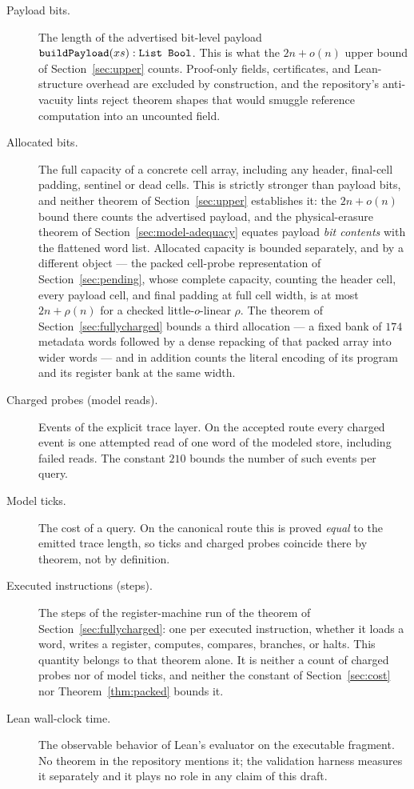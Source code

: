 \documentclass[11pt]{article}
\newcommand{\ledger}[1]{}
\newcommand{\leanid}[1]{\ifmmode\text{\ttfamily\upshape #1}\else{\def\UrlFont{\ttfamily\upshape}\nolinkurl{#1}}\fi}
\theoremstyle{definition}
\theoremstyle{remark}
\begin{document}
\begin{description}
\item[Payload bits.] The length of the advertised bit-level payload
  $\leanid{buildPayload}(xs) : \leanid{List Bool}$. This is what the
  $2n + o(n)$ upper bound of Section~\ref{sec:upper} counts. Proof-only
  fields, certificates, and Lean-structure overhead are excluded by
  construction, and the repository's anti-vacuity lints reject theorem
  shapes that would smuggle reference computation into an uncounted field.
\item[Allocated bits.] The full capacity of a concrete cell array,
  including any header, final-cell padding, sentinel or dead cells. This is
  strictly stronger than payload bits, and neither theorem of
  Section~\ref{sec:upper} establishes it: the $2n + o(n)$ bound there counts
  the advertised payload, and the physical-erasure theorem of
  Section~\ref{sec:model-adequacy} equates payload \emph{bit contents} with
  the flattened word list. Allocated capacity is bounded separately, and by
  a different object --- the packed cell-probe representation of
  Section~\ref{sec:pending}, whose complete capacity, counting the header
  cell, every payload cell, and final padding at full cell width, is at most
  $2n + \rho(n)$ for a checked little-$o$-linear
  $\rho$.\ledger{L-PACK-01} The theorem of
  Section~\ref{sec:fullycharged} bounds a third allocation --- a fixed bank
  of $174$ metadata words followed by a dense repacking of that packed array
  into wider words --- and in addition counts the literal encoding of its
  program and its register bank at the same width.\ledger{L-PQ-01}
\item[Charged probes (model reads).] Events of the explicit trace layer.
  On the accepted route every charged event is one attempted read of one
  word of the modeled store, including failed reads. The constant $210$
  bounds the number of such events per query.
\item[Model ticks.] The \leanid{Costed} cost of a query. On the canonical
  route this is proved \emph{equal} to the emitted trace length, so ticks
  and charged probes coincide there by theorem, not by definition.
\item[Executed instructions (steps).] The steps of the register-machine run
  of the theorem of Section~\ref{sec:fullycharged}: one per
  executed instruction, whether it loads a word, writes a register, computes,
  compares, branches, or halts. This quantity belongs to that theorem alone.
  It is neither a count of charged probes nor of model ticks, and neither
  the constant of Section~\ref{sec:cost} nor Theorem~\ref{thm:packed}
  bounds it.\ledger{L-PQ-01}
\item[Lean wall-clock time.] The observable behavior of Lean's evaluator on
  the executable fragment. No theorem in the repository mentions it; the
  validation harness measures it separately and it plays no role in any
  claim of this draft.
\end{description}
\end{document}
